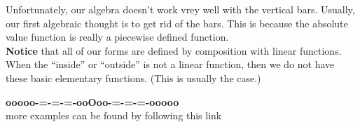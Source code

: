 \documentclass{ximera}
\begin{document}
Unfortunately, our algebra doesn't work vrey well with the vertical bars.  Usually, our first algebraic thought is to get rid of the bars.  This is because the absolute value function is really a piecewise defined function.   \\



\textbf{Notice} that all of our forms are defined by composition with linear functions.  \\

When the ``inside'' or ``outside'' is not a linear function, then we do not have these basic elementary functions. (This is usually the case.)


























\begin{center}
\textbf{\textcolor{green!50!black}{ooooo-=-=-=-ooOoo-=-=-=-ooooo}} \\

more examples can be found by following this link\\ 

\end{center}
\end{document}
